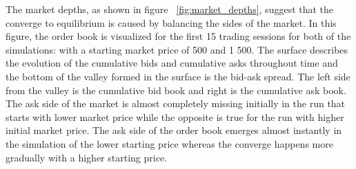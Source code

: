 The market depths, as shown in figure ~\ref{fig:market_depths}, suggest that the
converge to equilibrium is caused by balancing the sides of the market. 
In this figure, the order book is visualized for the first 15 trading sessions
for both of the simulations: with a starting market price of 500 and 1 500. 
The surface describes the evolution of the cumulative bids and cumulative asks 
throughout time and the bottom of the valley formed in the surface is the bid-ask spread. 
The left side from the valley is the cumulative bid book and right is the cumulative ask book. 
The ask side of the market is almost completely missing initially in the run that
starts with lower market price while the opposite is true for the run with higher
initial market price. The ask side of the order book emerges almost instantly 
in the simulation of the lower starting price whereas the converge happens more 
gradually with a higher starting price.


